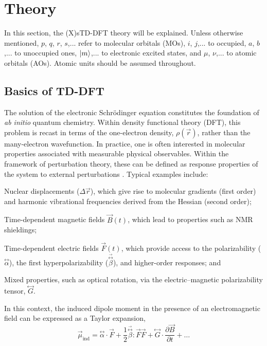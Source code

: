 \documentclass[%
 aip,
 amsmath,amssymb,
preprint,%
]{revtex4-2}
\newcommand\dstack[2]{\overset{#2}{#1}}
\begin{document}
\clearpage
\section{Theory}\label{sec:theory}

In this section, the (X)sTD-DFT theory will be explained. Unless otherwise mentioned, $p$, $q$, $r$, $s$,... refer to molecular orbitals (MOs), $i$, $j$,... to occupied, $a$, $b$,... to unoccupied ones, $\ket{m}$,... to electronic excited states, and $\mu$, $\nu$,... to atomic orbitals (AOs). 
Atomic units should be assumed throughout.

\subsection{Basics of TD-DFT}

The solution of the electronic Schrödinger equation constitutes the foundation of \emph{ab initio} quantum chemistry.  
Within density functional theory (DFT), this problem is recast in terms of the one-electron density, $\rho(\vec{r})$, rather than the many-electron wavefunction.  
In practice, one is often interested in molecular properties associated with measurable physical observables.  
Within the framework of perturbation theory, these can be defined as response properties of the system to external perturbations .  
Typical examples include:  
\begin{inparaenum}[(i)]
	\item Nuclear displacements ($\Delta \vec{r}$), which give rise to molecular gradients (first order) and harmonic vibrational frequencies derived from the Hessian (second order);
	\item Time-dependent magnetic fields $\vec{B}(t)$, which lead to properties such as NMR shieldings;
	\item Time-dependent electric fields $\vec{F}(t)$, which provide access to the polarizability ($\dstack{\alpha}{\leftrightarrow}$), the first hyperpolarizability ($\dstack{\beta}{\dstack{\leftrightarrow}{\rightarrow}}$), and higher-order responses; and
	\item Mixed properties, such as optical rotation, via the electric--magnetic polarizability tensor, $\dstack{G}{\leftrightarrow}$.
\end{inparaenum}
In this context, the induced dipole moment in the presence of an electromagnetic field can be expressed as a Taylor expansion,
\begin{equation}
	\vec{\mu}_{\mathrm{ind}} = \dstack{\alpha}{\leftrightarrow}\cdot\vec{F}
	+ \frac{1}{2}\dstack{\beta}{\dstack{\leftrightarrow}{\rightarrow}}:\vec{F}\vec{F}
	+ \dstack{G}{\leftrightarrow}\cdot\frac{\partial\vec{B}}{\partial t}
	+ \ldots
\end{equation}
\end{document}
